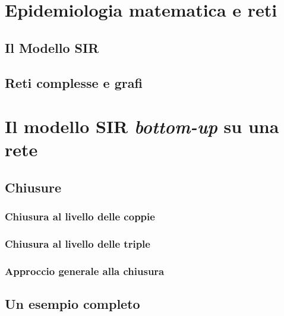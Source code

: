 \documentclass[12pt,a4paper,twoside]{report}
\begin{document}
\chapter{Epidemiologia matematica e reti}

\lipsum[1-5]

\section{Il Modello SIR}

\lipsum[6-10]

\section{Reti complesse e grafi}

\lipsum[6-10]

\chapter{Il modello SIR \textit{bottom-up} su una rete}

\lipsum[6-10]

\section{Chiusure}

\lipsum[6-10]

\subsection{Chiusura al livello delle coppie}

\lipsum[6-10]

\subsection{Chiusura al livello delle triple}

\lipsum[6-10]

\subsection{Approccio generale alla chiusura}

\lipsum[6-10]

\section{Un esempio completo}

\lipsum[6-10]
\end{document}
